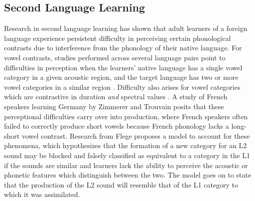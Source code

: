 \subsection{Second Language Learning}
Research in second language learning has shown that adult learners of a foreign language experience persistent difficulty in perceiving certain phonological contrasts due to interference from the phonology of their native language. For vowel contrasts, studies performed across several language pairs point to difficulties in perception when the learners' native language has a single vowel category in a given acoustic region, and the target language has two or more vowel categories in a similar region \citep{pallier1997limit,flege1999native}. Difficulty also arises for vowel categories which are contrastive in duration \textit{and} spectral values \cite{weber2014treack}. A study of French speakers learning Germany by Zimmerer and Trouvain \citep{zimmerer pending publication} posits that these perceptional difficulties carry over into production, where French speakers often failed to correctly produce short vowels because French phonology lacks a long-short vowel contrast.  Research from Flege \cite{flege1995second} proposes a model to account for these phenomena, which hypothesizes that the formation of a new category for an L2 sound may be blocked and falsely classified as equivalent to a category in the L1 if the sounds are similar and learners lack the ability to perceive the acoustic or phonetic features which distinguish between the two. The model goes on to state that the production of the L2 sound will resemble that of the L1 category to which it was assimilated. 
\\
\\
